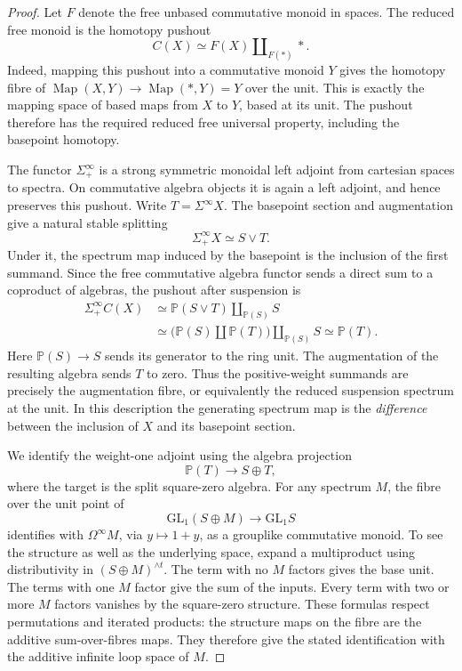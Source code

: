 \begin{proof}
Let $F$ denote the free unbased commutative monoid in spaces. The reduced
free monoid is the homotopy pushout
\[
 C(X)\simeq F(X)\amalg_{F(*)}*.
\]
Indeed, mapping this pushout into a commutative monoid $Y$ gives the
homotopy fibre of
$\operatorname{Map}(X,Y)\to\operatorname{Map}(*,Y)=Y$
over the unit. This is exactly the mapping space of based maps from $X$
to $Y$, based at its unit. The pushout therefore has the required reduced
free universal property, including the basepoint homotopy.

The functor $\Sigma^\infty_+$ is a strong symmetric monoidal left adjoint
from cartesian spaces to spectra. On commutative algebra objects it is
again a left adjoint, and hence preserves this pushout. Write
$T=\Sigma^\infty X$. The basepoint section and augmentation give a natural
stable splitting
\[
 \Sigma^\infty_+X\simeq S\vee T.
\]
Under it, the spectrum map induced by the basepoint is the inclusion of
the first summand. Since the free commutative algebra functor sends a
direct sum to a coproduct of algebras, the pushout after suspension is
\[
 \begin{aligned}
 \Sigma^\infty_+C(X)
 &\simeq\mathbb P(S\vee T)\amalg_{\mathbb P(S)}S\\
 &\simeq
 \bigl(\mathbb P(S)\amalg\mathbb P(T)\bigr)
       \amalg_{\mathbb P(S)}S
 \simeq\mathbb P(T).
 \end{aligned}
\]
Here $\mathbb P(S)\to S$ sends its generator to the ring unit. The
augmentation of the resulting algebra sends $T$ to zero. Thus the
positive-weight summands are precisely the augmentation fibre, or
equivalently the reduced suspension spectrum at the unit. In this
description the generating spectrum map is the \emph{difference} between
the inclusion of $X$ and its basepoint section.

We identify the weight-one adjoint using the algebra projection
\[
 \mathbb P(T)\longrightarrow S\oplus T,
\]
where the target is the split square-zero algebra. For any spectrum $M$,
the fibre over the unit point of
\[
 \mathrm{GL}_1(S\oplus M)\longrightarrow\mathrm{GL}_1S
\]
identifies with $\Omega^\infty M$, via $y\mapsto1+y$, as a grouplike
commutative monoid. To see the structure as well as the underlying space,
expand a multiproduct using distributivity in
$(S\oplus M)^{\wedge t}$. The term with no $M$ factors gives the base
unit. The terms with one $M$ factor give the sum of the inputs. Every term
with two or more $M$ factors vanishes by the square-zero structure. These
formulas respect permutations and iterated products: the structure maps
on the fibre are the additive sum-over-fibres maps. They therefore give
the stated identification with the additive infinite loop space of $M$.


\end{proof}
